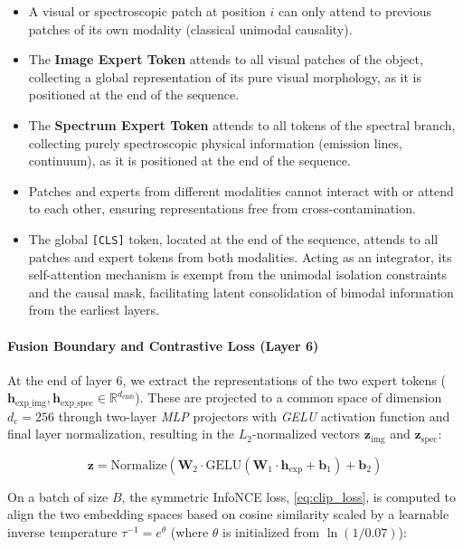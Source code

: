 \begin{itemize}
\item A visual or spectroscopic patch at position $i$ can only attend to previous patches of its own modality (classical unimodal causality).
\item The \textbf{Image Expert Token} attends to all visual patches of the object, collecting a global representation of its pure visual morphology, as it is positioned at the end of the sequence.
\item The \textbf{Spectrum Expert Token} attends to all tokens of the spectral branch, collecting purely spectroscopic physical information (emission lines, continuum), as it is positioned at the end of the sequence.
\item Patches and experts from different modalities cannot interact with or attend to each other, ensuring representations free from cross-contamination.
\item The global \texttt{[CLS]} token, located at the end of the sequence, attends to all patches and expert tokens from both modalities. Acting as an integrator, its self-attention mechanism is exempt from the unimodal isolation constraints and the causal mask, facilitating latent consolidation of bimodal information from the earliest layers.
\end{itemize}


\paragraph{Fusion Boundary and Contrastive Loss (Layer 6)}

At the end of layer 6, we extract the representations of the two expert tokens ($\mathbf{h}_{\text{exp\_img}}, \mathbf{h}_{\text{exp\_spec}} \in \mathbb{R}^{d_{\text{emb}}}$). These are projected to a common space of dimension $d_c = 256$ through two-layer \textit{\gls{MLP}} projectors with \textit{\gls{GELU}} activation function and final layer normalization, resulting in the $L_2$-normalized vectors $\mathbf{z}_{\text{img}}$ and $\mathbf{z}_{\text{spec}}$:

\begin{equation}
\mathbf{z} = \text{Normalize}\left(\mathbf{W}_2 \cdot \text{GELU}\left(\mathbf{W}_1 \cdot \mathbf{h}_{\text{exp}} + \mathbf{b}_1\right) + \mathbf{b}_2\right)
\label{eq:normalize_z}
\end{equation}

On a batch of size $B$, the symmetric InfoNCE loss, \cref{eq:clip_loss}, is computed to align the two embedding spaces based on cosine similarity scaled by a learnable inverse temperature $\tau^{-1} = e^{\theta}$ (where $\theta$ is initialized from $\ln\left(1/0.07\right)$):

